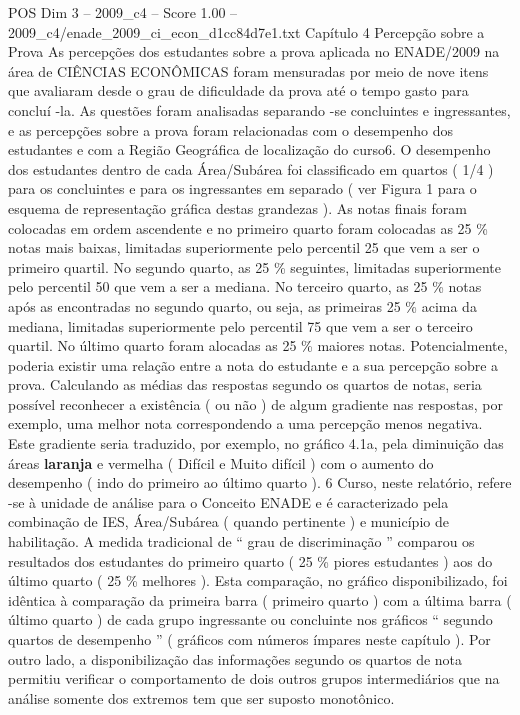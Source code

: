 \begin{textsample}{POS Dim 3 – 2009\_c4 – Score 1.00 – 2009\_c4/enade\_2009\_ci\_econ\_d1cc84d7e1.txt}  \label{ex:f3_pos_125}
Capítulo 4 Percepção sobre a Prova As percepções dos estudantes sobre a prova aplicada no ENADE/2009 na área de CIÊNCIAS ECONÔMICAS foram mensuradas por meio de nove itens que avaliaram desde o grau de dificuldade da prova até o tempo gasto para concluí -la.
As questões foram analisadas separando -se concluintes e ingressantes, e as percepções sobre a prova foram relacionadas com o desempenho dos estudantes e com a Região Geográfica de localização do curso6.
O desempenho dos estudantes dentro de cada Área/Subárea foi classificado em quartos ( 1/4 ) para os concluintes e para os ingressantes em separado ( ver Figura 1 para o esquema de representação gráfica destas grandezas ).
As notas finais foram colocadas em ordem ascendente e no primeiro quarto foram colocadas as 25 \% notas mais baixas, limitadas superiormente pelo percentil 25 que vem a ser o primeiro quartil.
No segundo quarto, as 25 \% seguintes, limitadas superiormente pelo percentil 50 que vem a ser a mediana.
No terceiro quarto, as 25 \% notas após as encontradas no segundo quarto, ou seja, as primeiras 25 \% acima da mediana, limitadas superiormente pelo percentil 75 que vem a ser o terceiro quartil.
No último quarto foram alocadas as 25 \% maiores notas.
Potencialmente, poderia existir uma relação entre a nota do estudante e a sua percepção sobre a prova.
Calculando as médias das respostas segundo os quartos de notas, seria possível reconhecer a existência ( ou não ) de algum gradiente nas respostas, por exemplo, uma melhor nota correspondendo a uma percepção menos negativa.
Este gradiente seria traduzido, por exemplo, no gráfico 4.1a, pela diminuição das áreas \textbf{laranja} e vermelha ( Difícil e Muito difícil ) com o aumento do desempenho ( indo do primeiro ao último quarto ). 6 Curso, neste relatório, refere -se à unidade de análise para o Conceito ENADE e é caracterizado pela combinação de IES, Área/Subárea ( quando pertinente ) e município de habilitação.
A medida tradicional de “ grau de discriminação ” comparou os resultados dos estudantes do primeiro quarto ( 25 \% piores estudantes ) aos do último quarto ( 25 \% melhores ).
Esta comparação, no gráfico disponibilizado, foi idêntica à comparação da primeira barra ( primeiro quarto ) com a última barra ( último quarto ) de cada grupo ingressante ou concluinte nos gráficos “ segundo quartos de desempenho ” ( gráficos com números ímpares neste capítulo ).
Por outro lado, a disponibilização das informações segundo os quartos de nota permitiu verificar o comportamento de dois outros grupos intermediários que na análise somente dos extremos tem que ser suposto monotônico.

\end{textsample}
